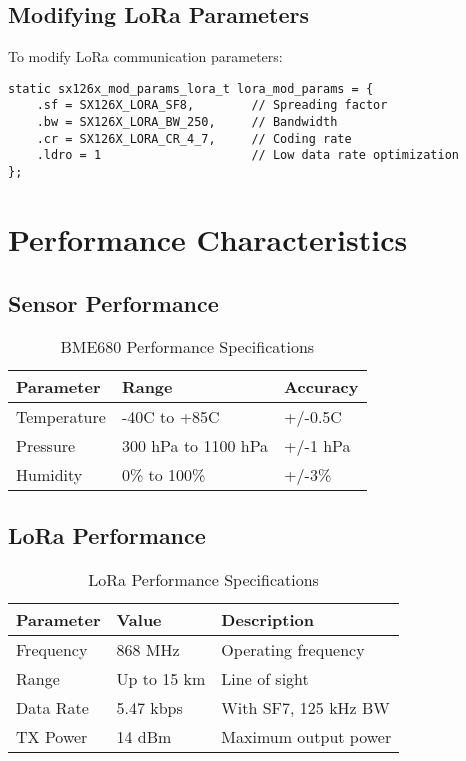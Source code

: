 \documentclass[11pt,a4paper]{article}
\begin{document}
\subsection{Modifying LoRa Parameters}
To modify LoRa communication parameters:

\begin{lstlisting}[caption=LoRa Configuration Example]
static sx126x_mod_params_lora_t lora_mod_params = {
    .sf = SX126X_LORA_SF8,        // Spreading factor
    .bw = SX126X_LORA_BW_250,     // Bandwidth
    .cr = SX126X_LORA_CR_4_7,     // Coding rate
    .ldro = 1                     // Low data rate optimization
};
\end{lstlisting}

\section{Performance Characteristics}

\subsection{Sensor Performance}
\begin{table}[h]
\centering
\begin{tabular}{|l|l|l|}
\hline
\textbf{Parameter} & \textbf{Range} & \textbf{Accuracy} \\
\hline
Temperature & -40C to +85C & +/-0.5C \\
\hline
Pressure & 300 hPa to 1100 hPa & +/-1 hPa \\
\hline
Humidity & 0\% to 100\% & +/-3\% \\
\hline
\end{tabular}
\caption{BME680 Performance Specifications}
\end{table}

\subsection{LoRa Performance}
\begin{table}[h]
\centering
\begin{tabular}{|l|l|l|}
\hline
\textbf{Parameter} & \textbf{Value} & \textbf{Description} \\
\hline
Frequency & 868 MHz & Operating frequency \\
\hline
Range & Up to 15 km & Line of sight \\
\hline
Data Rate & 5.47 kbps & With SF7, 125 kHz BW \\
\hline
TX Power & 14 dBm & Maximum output power \\
\hline
\end{tabular}
\caption{LoRa Performance Specifications}
\end{table}
\end{document}

